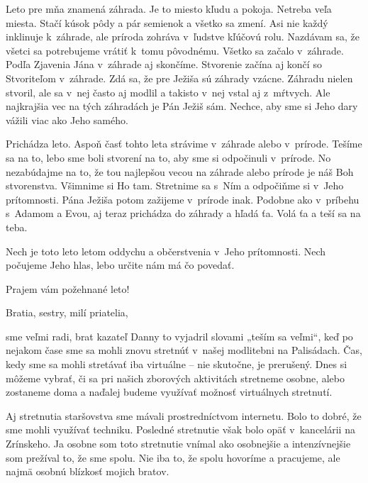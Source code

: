 


Leto pre mňa znamená záhrada. Je to miesto kľudu a pokoja. Netreba veľa miesta. Stačí kúsok pôdy a pár semienok a všetko sa zmení. Asi nie každý inklinuje k~záhrade, ale príroda zohráva v~ľudstve kľúčovú rolu. Nazdávam sa, že všetci sa potrebujeme vrátiť k~tomu pôvodnému. Všetko sa začalo v~záhrade. Podľa Zjavenia Jána v~záhrade aj skončíme. Stvorenie začína aj končí so Stvoriteľom v~záhrade. Zdá sa, že pre Ježiša sú záhrady vzácne. Záhradu nielen stvoril, ale sa v~nej často aj modlil a takisto v~nej vstal aj z~mŕtvych. Ale najkrajšia vec na tých záhradách je Pán Ježiš sám. Nechce, aby sme si Jeho dary vážili viac ako Jeho samého.

Prichádza leto. Aspoň časť tohto leta strávime v~záhrade alebo v~prírode. Tešíme sa na to, lebo sme boli stvorení na to, aby sme si odpočinuli v~prírode. No nezabúdajme na to, že tou najlepšou vecou na záhrade alebo prírode je náš Boh stvorenstva. Všimnime si Ho tam. Stretnime sa s~Ním a odpočiňme si v~Jeho prítomnosti. Pána Ježiša potom zažijeme v~prírode inak. Podobne ako v~príbehu s~Adamom a Evou, aj teraz prichádza do záhrady a hľadá ťa. Volá ťa a teší sa na teba.

Nech je toto leto letom oddychu a občerstvenia v~Jeho prítomnosti. Nech počujeme Jeho hlas, lebo určite nám má čo povedať.

Prajem vám požehnané leto!



Bratia, sestry, milí priatelia,

sme veľmi radi, brat kazateľ Danny to vyjadril slovami „teším sa veľmi“, keď po nejakom čase sme sa mohli znovu stretnúť v~našej modlitebni na Palisádach. Čas, kedy sme sa mohli stretávať iba virtuálne -- nie skutočne, je prerušený. Dnes si môžeme vybrať, či sa pri našich zborových aktivitách stretneme osobne, alebo zostaneme doma a naďalej budeme využívať možnosť virtuálnych stretnutí.

Aj stretnutia staršovstva sme mávali prostredníctvom internetu. Bolo to dobré, že sme mohli využívať techniku. Posledné stretnutie však bolo opäť v~kancelárii na Zrínskeho. Ja osobne som toto stretnutie vnímal ako osobnejšie a intenzívnejšie som prežíval to, že sme spolu. Nie iba to, že spolu hovoríme a pracujeme, ale najmä osobnú blízkosť mojich bratov.

